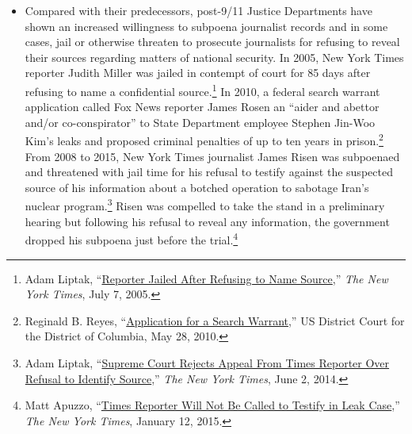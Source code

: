 \documentclass[12pt]{article}
\begin{document}
\begin{itemize}
\item Compared with their predecessors, post-9/11 Justice Departments have shown an increased willingness to subpoena journalist records and in some cases, jail or otherwise threaten to prosecute journalists for refusing to reveal their sources regarding matters of national security. In 2005, New York Times reporter Judith Miller was jailed in contempt of court for 85 days after refusing to name a confidential source.\footnote{Adam Liptak, ``\href{https://www.nytimes.com/2005/07/07/politics/reporter-jailed-after-refusing-to-name-source.html}{Reporter Jailed After Refusing to Name Source},'' \emph{The New York Times}, July 7, 2005.} In 2010, a federal search warrant application called Fox News reporter James Rosen an ``aider and abettor and/or co-conspirator'' to State Department employee Stephen Jin-Woo Kim's leaks and proposed criminal penalties of up to ten years in prison.\footnote{Reginald B. Reyes, ``\href{http://www.documentcloud.org/documents/702199-d-o-j-versus-james-rosen.html\#document/p4}{Application for a Search Warrant},'' US District Court for the District of Columbia, May 28, 2010.} From 2008 to 2015, New York Times journalist James Risen was subpoenaed and threatened with jail time for his refusal to testify against the suspected source of his information about a botched operation to sabotage Iran's nuclear program.\footnote{Adam Liptak, ``\href{https://www.nytimes.com/2014/06/03/us/james-risen-faces-jail-time-for-refusing-to-identify-a-confidential-source.html}{Supreme Court Rejects Appeal From Times Reporter Over Refusal to Identify Source},'' \emph{The New York Times}, June 2, 2014.} Risen was compelled to take the stand in a preliminary hearing but following his refusal to reveal any information, the government dropped his subpoena just before the trial.\footnote{Matt Apuzzo, ``\href{https://www.nytimes.com/2015/01/13/us/times-reporter-james-risen-will-not-be-called-to-testify-in-leak-case-lawyers-say.html?_r=0}{Times Reporter Will Not Be Called to Testify in Leak Case},'' \emph{The New York Times}, January 12, 2015.}


\end{itemize}
\end{document}
